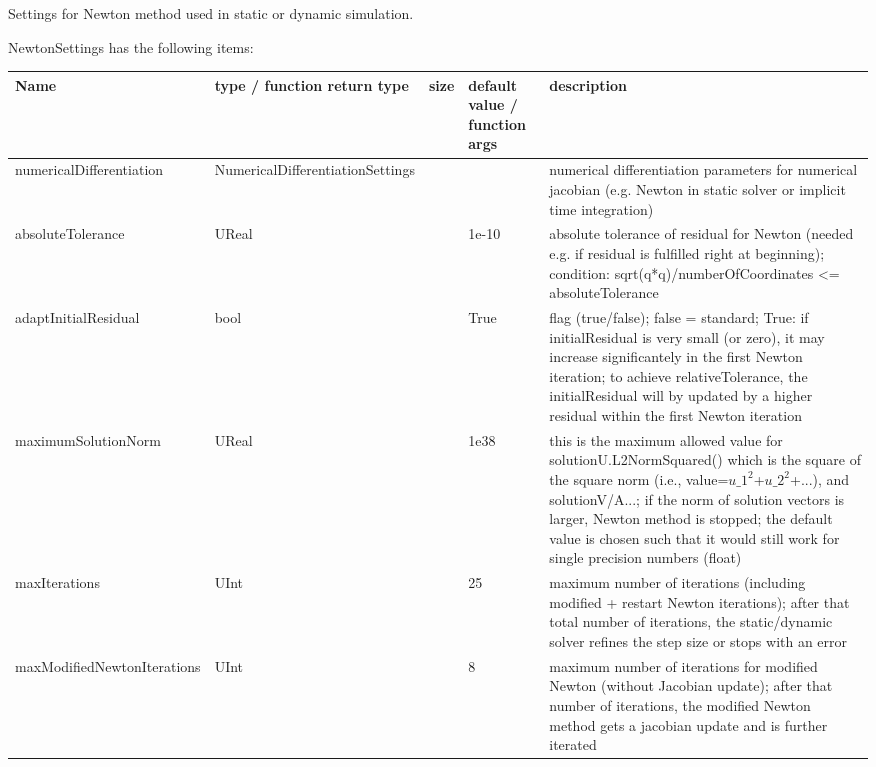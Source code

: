 
\label{sec:NewtonSettings}
Settings for Newton method used in static or dynamic simulation.

\noindent NewtonSettings has the following items:
\begin{center}
  \footnotesize
  \begin{longtable}{| p{4.2cm} | p{2.5cm} | p{0.3cm} | p{3.0cm} | p{6cm} |}
    \hline
    \bf Name & \bf type / function return type & \bf size & \bf default value / function args & \bf description \\ \hline
    numericalDifferentiation &     NumericalDifferentiationSettings &      &      &     numerical differentiation parameters for numerical jacobian (e.g. Newton in static solver or implicit time integration)\\ \hline
    absoluteTolerance &     UReal &      &     1e-10 &     absolute tolerance of residual for Newton (needed e.g. if residual is fulfilled right at beginning); condition: sqrt(q*q)/numberOfCoordinates <= absoluteTolerance\\ \hline
    adaptInitialResidual &     bool &      &     True &     flag (true/false); false = standard; True: if initialResidual is very small (or zero), it may increase significantely in the first Newton iteration; to achieve relativeTolerance, the initialResidual will by updated by a higher residual within the first Newton iteration\\ \hline
    maximumSolutionNorm &     UReal &      &     1e38 &     this is the maximum allowed value for solutionU.L2NormSquared() which is the square of the square norm (i.e., value=$u\_1^2$+$u\_2^2$+...), and solutionV/A...; if the norm of solution vectors is larger, Newton method is stopped; the default value is chosen such that it would still work for single precision numbers (float)\\ \hline
    maxIterations &     UInt &      &     25 &     maximum number of iterations (including modified + restart Newton iterations); after that total number of iterations, the static/dynamic solver refines the step size or stops with an error\\ \hline
    maxModifiedNewtonIterations &     UInt &      &     8 &     maximum number of iterations for modified Newton (without Jacobian update); after that number of iterations, the modified Newton method gets a jacobian update and is further iterated\\ \hline

\end{longtable}
\end{center}
